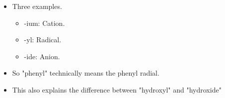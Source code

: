 \documentclass[../notes.tex]{subfiles}
\begin{document}
\begin{itemize}
\begin{itemize}
        \item Three examples.
        \begin{itemize}
            \item -ium: Cation.
            \item -yl: Radical.
            \item -ide: Anion.
        \end{itemize}
        \item So "phenyl" technically means the phenyl radial.
        \item This also explains the difference between "hydroxyl" and "hydroxide"
    \end{itemize}
\end{itemize}
\end{document}
